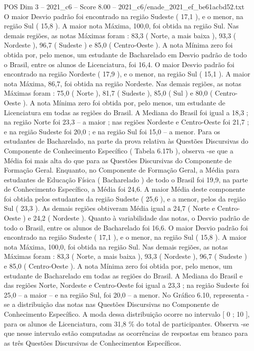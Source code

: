 \begin{textsample}{POS Dim 3 – 2021\_c6 – Score 8.00 – 2021\_c6/enade\_2021\_ef\_be61acbd52.txt}
O maior Desvio padrão foi encontrado na região Sudeste ( 17,1 ), e o menor, na região Sul ( 15,8 ).
A maior nota Máxima, 100,0, foi obtida na região Sul.
Nas demais regiões, as notas Máximas foram : 83,3 ( Norte, a mais baixa ), 93,3 ( Nordeste ), 96,7 ( Sudeste ) e 85,0 ( Centro-Oeste ).
A nota Mínima zero foi obtida por, pelo menos, um estudante de Bacharelado em Desvio padrão de todo o Brasil, entre os alunos de Licenciatura, foi 16,4.
O maior Desvio padrão foi encontrado na região Nordeste ( 17,9 ), e o menor, na região Sul ( 15,1 ).
A maior nota Máxima, 86,7, foi obtida na região Nordeste.
Nas demais regiões, as notas Máximas foram : 75,0 ( Norte ), 81,7 ( Sudeste ), 85,0 ( Sul ) e 80,0 ( Centro-Oeste ).
A nota Mínima zero foi obtida por, pelo menos, um estudante de Licenciatura em todas as regiões do Brasil.
A Mediana do Brasil foi igual a 18,3 ; na região Norte foi 23,3 – a maior ; nas regiões Nordeste e Centro-Oeste foi 21,7 ; e na região Sudeste foi 20,0 ; e na região Sul foi 15,0 – a menor.
Para os estudantes de Bacharelado, na parte da prova relativa às Questões Discursivas do Componente de Conhecimento Específico ( Tabela 6.17b ), observa -se que a Média foi mais alta do que para as Questões Discursivas do Componente de Formação Geral.
Enquanto, no Componente de Formação Geral, a Média para estudantes de Educação Física ( Bacharelado ) de todo o Brasil foi 19,9, na parte de Conhecimento Específico, a Média foi 24,6.
A maior Média deste componente foi obtida pelos estudantes da região Sudeste ( 25,6 ), e a menor, pelos da região Sul ( 23,3 ).
As demais regiões obtiveram Média igual a 24,7 ( Norte e Centro-Oeste ) e 24,2 ( Nordeste ).
Quanto à variabilidade das notas, o Desvio padrão de todo o Brasil, entre os alunos de Bacharelado foi 16,6.
O maior Desvio padrão foi encontrado na região Sudeste ( 17,1 ), e o menor, na região Sul ( 15,8 ).
A maior nota Máxima, 100,0, foi obtida na região Sul.
Nas demais regiões, as notas Máximas foram : 83,3 ( Norte, a mais baixa ), 93,3 ( Nordeste ), 96,7 ( Sudeste ) e 85,0 ( Centro-Oeste ).
A nota Mínima zero foi obtida por, pelo menos, um estudante de Bacharelado em todas as regiões do Brasil.
A Mediana do Brasil e das regiões Norte, Nordeste e Centro-Oeste foi igual a 23,3 ; na região Sudeste foi 25,0 – a maior – e na região Sul, foi 20,0 – a menor.
No Gráfico 6.10, representa -se a distribuição das notas nas Questões Discursivas no Componente de Conhecimento Específico.
A moda dessa distribuição ocorre no intervalo [ 0 ; 10 ], para os alunos de Licenciatura, com 31,8 \% do total de participantes.
Observa -se que nesse intervalo estão computadas as ocorrências de respostas em branco para as três Questões Discursivas de Conhecimentos Específicos.

\end{textsample}
